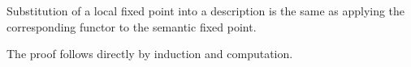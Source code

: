 \begin{lemma}\label{lem:sub-sem}
Substitution of a local fixed point into a description is the same as applying the corresponding functor to the semantic fixed point.
\begin{code}%
%
\>[4]\AgdaSpace{}%
\AgdaSymbol{:}\AgdaSpace{}%
\AgdaSpace{}%
\AgdaSpace{}%
\AgdaSpace{}%
\AgdaSpace{}%
\AgdaSpace{}%
\AgdaSpace{}%
\AgdaSymbol{(}\AgdaSpace{}%
\AgdaSymbol{)}\AgdaSpace{}%
\AgdaSpace{}%
\AgdaSpace{}%
\AgdaSpace{}%
\AgdaSpace{}%
\AgdaSpace{}%
\AgdaSpace{}%
\AgdaSpace{}%
\AgdaSpace{}%
\AgdaSpace{}%
\AgdaSpace{}%
\<%
\end{code}
\end{lemma}
The proof follows directly by induction and computation.
